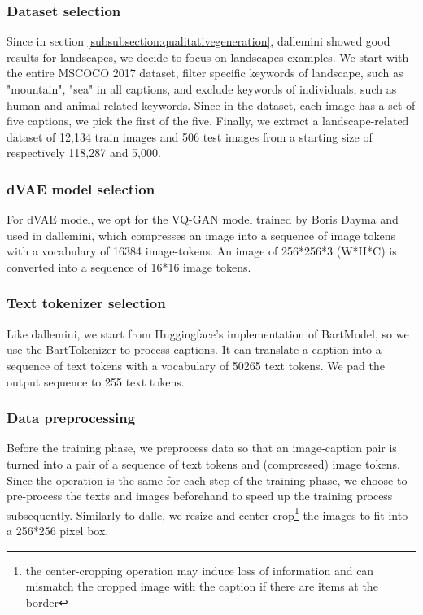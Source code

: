 \documentclass{article}
\begin{document}
\begin{multicols}{2}
\subsubsection{Dataset selection}

Since in section \ref{subsubsection:qualitativegeneration}, \gls{dallemini} showed good results for landscapes, we decide to focus on landscapes examples. We start with the entire MSCOCO 2017 dataset, filter specific keywords of landscape, such as "mountain", "sea" in all captions, and exclude keywords of individuals, such as human and animal related-keywords. Since in the dataset, each image has a set of five captions, we pick the first of the five. Finally, we extract a landscape-related dataset of 12,134 train images and 506 test images from a starting size of respectively 118,287 and 5,000.

\subsubsection{dVAE model selection}

For dVAE model, we opt for the VQ-GAN model trained by Boris Dayma and used in \gls{dallemini}, which compresses an image into a sequence of image tokens with a vocabulary of 16384 image-tokens. An image of 256*256*3 (W*H*C) is converted into a sequence of 16*16 image tokens.

\subsubsection{Text tokenizer selection}
Like \gls{dallemini}, we start from Huggingface's implementation of BartModel, so we use the BartTokenizer to process captions. It can translate a caption into a sequence of text tokens with a vocabulary of 50265 text tokens. We pad the output sequence to 255 text tokens.

\subsubsection{Data preprocessing}

Before the training phase, we preprocess data so that an image-caption pair is turned into a pair of a sequence of text tokens and (compressed) image tokens. Since the operation is the same for each step of the training phase, we choose to pre-process the texts and images beforehand to speed up the training process subsequently. Similarly to \gls{dalle}, we resize and center-crop\footnote{the center-cropping operation may induce loss of information and can mismatch the cropped image with the caption if there are items at the border} the images to fit into a 256*256 pixel box.


\end{multicols}
\end{document}
